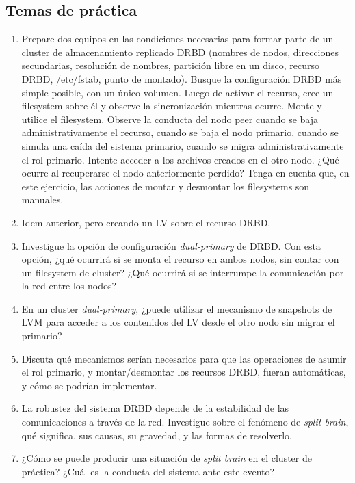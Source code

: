 \subsection{Temas de práctica}
\begin{enumerate}
	\item Prepare dos equipos en las condiciones necesarias para formar parte de un cluster de almacenamiento replicado DRBD (nombres de nodos, direcciones secundarias, resolución de nombres, partición libre en un disco, recurso DRBD, /etc/fstab, punto de montado). Busque la configuración DRBD más simple posible, con un único volumen. Luego de activar el recurso, cree un filesystem sobre él y observe la sincronización mientras ocurre. Monte y utilice el filesystem. Observe la conducta del nodo peer cuando se baja administrativamente el recurso, cuando se baja el nodo primario, cuando se simula una caída del sistema primario, cuando se migra administrativamente el rol primario. Intente acceder a los archivos creados en el otro nodo. ¿Qué ocurre al recuperarse el nodo anteriormente perdido? Tenga en cuenta que, en este ejercicio, las acciones de montar y desmontar los filesystems son manuales.
	\item Idem anterior, pero creando un LV sobre el recurso DRBD.   
	\item Investigue la opción de configuración \textit{dual-primary} de DRBD. Con esta opción, ¿qué ocurrirá si se monta el recurso en ambos nodos, sin contar con un filesystem de cluster? ¿Qué ocurrirá si se interrumpe la comunicación por la red entre los nodos?
	\item En un cluster \textit{dual-primary}, ¿puede utilizar el mecanismo de snapshots de LVM para acceder a los contenidos del LV desde el otro nodo sin migrar el primario?  
	\item Discuta qué mecanismos serían necesarios para que las operaciones de asumir el rol primario, y montar/desmontar los recursos DRBD, fueran automáticas, y cómo se podrían implementar. 
	\item La robustez del sistema DRBD depende de la estabilidad de las comunicaciones a través de la red. Investigue sobre el fenómeno de \textit{split brain}, qué significa, sus causas, su gravedad, y las formas de resolverlo.
	\item ¿Cómo se puede producir una situación de \textit{split brain} en el cluster de práctica? ¿Cuál es la conducta del sistema ante este evento?
\end{enumerate}
